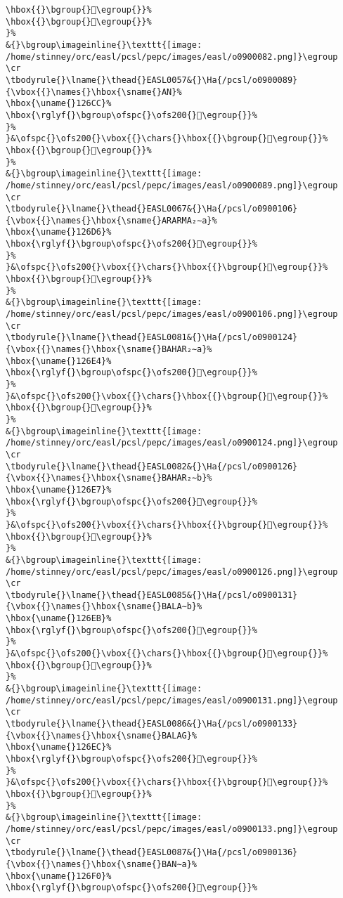 \begin{verbatim}
\hbox{{}\bgroup{}𒛅\egroup{}}%
\hbox{{}\bgroup{}𒛉\egroup{}}%
}%
&{}\bgroup\imageinline{}\texttt{[image: /home/stinney/orc/easl/pcsl/pepc/images/easl/o0900082.png]}\egroup
\cr
\tbodyrule{}\lname{}\thead{}EASL0057&{}\Ha{/pcsl/o0900089}{\vbox{{}\names{}\hbox{\sname{}AN}%
\hbox{\uname{}126CC}%
\hbox{\rglyf{}\bgroup\ofspc{}\ofs200{}𒛌\egroup{}}%
}%
}&\ofspc{}\ofs200{}\vbox{{}\chars{}\hbox{{}\bgroup{}𒛍\egroup{}}%
\hbox{{}\bgroup{}𒛌\egroup{}}%
}%
&{}\bgroup\imageinline{}\texttt{[image: /home/stinney/orc/easl/pcsl/pepc/images/easl/o0900089.png]}\egroup
\cr
\tbodyrule{}\lname{}\thead{}EASL0067&{}\Ha{/pcsl/o0900106}{\vbox{{}\names{}\hbox{\sname{}ARARMA₂∼a}%
\hbox{\uname{}126D6}%
\hbox{\rglyf{}\bgroup\ofspc{}\ofs200{}𒛖\egroup{}}%
}%
}&\ofspc{}\ofs200{}\vbox{{}\chars{}\hbox{{}\bgroup{}𒛗\egroup{}}%
\hbox{{}\bgroup{}𒛖\egroup{}}%
}%
&{}\bgroup\imageinline{}\texttt{[image: /home/stinney/orc/easl/pcsl/pepc/images/easl/o0900106.png]}\egroup
\cr
\tbodyrule{}\lname{}\thead{}EASL0081&{}\Ha{/pcsl/o0900124}{\vbox{{}\names{}\hbox{\sname{}BAHAR₂∼a}%
\hbox{\uname{}126E4}%
\hbox{\rglyf{}\bgroup\ofspc{}\ofs200{}𒛤\egroup{}}%
}%
}&\ofspc{}\ofs200{}\vbox{{}\chars{}\hbox{{}\bgroup{}𒛤\egroup{}}%
\hbox{{}\bgroup{}𒛥\egroup{}}%
}%
&{}\bgroup\imageinline{}\texttt{[image: /home/stinney/orc/easl/pcsl/pepc/images/easl/o0900124.png]}\egroup
\cr
\tbodyrule{}\lname{}\thead{}EASL0082&{}\Ha{/pcsl/o0900126}{\vbox{{}\names{}\hbox{\sname{}BAHAR₂∼b}%
\hbox{\uname{}126E7}%
\hbox{\rglyf{}\bgroup\ofspc{}\ofs200{}𒛧\egroup{}}%
}%
}&\ofspc{}\ofs200{}\vbox{{}\chars{}\hbox{{}\bgroup{}𒛦\egroup{}}%
\hbox{{}\bgroup{}𒛧\egroup{}}%
}%
&{}\bgroup\imageinline{}\texttt{[image: /home/stinney/orc/easl/pcsl/pepc/images/easl/o0900126.png]}\egroup
\cr
\tbodyrule{}\lname{}\thead{}EASL0085&{}\Ha{/pcsl/o0900131}{\vbox{{}\names{}\hbox{\sname{}BALA∼b}%
\hbox{\uname{}126EB}%
\hbox{\rglyf{}\bgroup\ofspc{}\ofs200{}𒛫\egroup{}}%
}%
}&\ofspc{}\ofs200{}\vbox{{}\chars{}\hbox{{}\bgroup{}𒛪\egroup{}}%
\hbox{{}\bgroup{}𒛫\egroup{}}%
}%
&{}\bgroup\imageinline{}\texttt{[image: /home/stinney/orc/easl/pcsl/pepc/images/easl/o0900131.png]}\egroup
\cr
\tbodyrule{}\lname{}\thead{}EASL0086&{}\Ha{/pcsl/o0900133}{\vbox{{}\names{}\hbox{\sname{}BALAG}%
\hbox{\uname{}126EC}%
\hbox{\rglyf{}\bgroup\ofspc{}\ofs200{}𒛬\egroup{}}%
}%
}&\ofspc{}\ofs200{}\vbox{{}\chars{}\hbox{{}\bgroup{}𒛬\egroup{}}%
\hbox{{}\bgroup{}𒛭\egroup{}}%
}%
&{}\bgroup\imageinline{}\texttt{[image: /home/stinney/orc/easl/pcsl/pepc/images/easl/o0900133.png]}\egroup
\cr
\tbodyrule{}\lname{}\thead{}EASL0087&{}\Ha{/pcsl/o0900136}{\vbox{{}\names{}\hbox{\sname{}BAN∼a}%
\hbox{\uname{}126F0}%
\hbox{\rglyf{}\bgroup\ofspc{}\ofs200{}𒛰\egroup{}}%

\end{verbatim}
